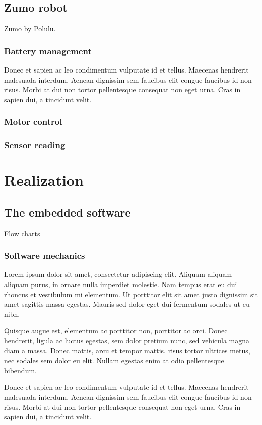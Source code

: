\documentclass[11pt,a4paper,oneside,article]{memoir}
\begin{document}
\section{Zumo robot}
Zumo by Polulu.

\subsection{Battery management}
Donec et sapien ac leo condimentum vulputate id et tellus. Maecenas hendrerit malesuada interdum. Aenean dignissim sem faucibus elit congue faucibus id non risus. Morbi at dui non tortor pellentesque consequat non eget urna. Cras in sapien dui, a tincidunt velit.

\subsection{Motor control}

\subsection{Sensor reading}

\chapter{Realization}

\section{The embedded software}
Flow charts

\subsection{Software mechanics}
Lorem ipsum dolor sit amet, consectetur adipiscing elit. Aliquam aliquam aliquam purus, in ornare nulla imperdiet molestie. Nam tempus erat eu dui rhoncus et vestibulum mi elementum. Ut porttitor elit sit amet justo dignissim sit amet sagittis massa egestas. Mauris sed dolor eget dui fermentum sodales ut eu nibh. 

Quisque augue est, elementum ac porttitor non, porttitor ac orci. Donec hendrerit, ligula ac luctus egestas, sem dolor pretium nunc, sed vehicula magna diam a massa. Donec mattis, arcu et tempor mattis, risus tortor ultrices metus, nec sodales sem dolor eu elit. Nullam egestas enim at odio pellentesque bibendum. 

Donec et sapien ac leo condimentum vulputate id et tellus. Maecenas hendrerit malesuada interdum. Aenean dignissim sem faucibus elit congue faucibus id non risus. Morbi at dui non tortor pellentesque consequat non eget urna. Cras in sapien dui, a tincidunt velit.
\end{document}
